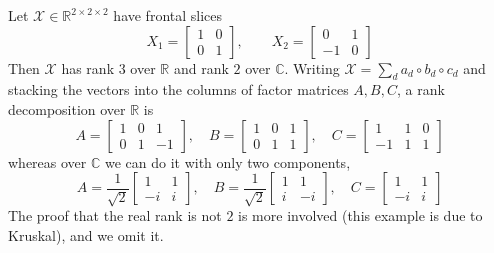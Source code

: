 \begin{enumerate}
    \begin{example}
      \label{ex:rank-over-r-vs-c}
      Let $\mathcal{X} \in \mathbb{R}^{2 \times 2 \times 2}$ have frontal slices
      \begin{equation}
        X_1 = \begin{bmatrix} 1 & 0 \\ 0 & 1 \end{bmatrix}, \qquad X_2 = \begin{bmatrix} 0 & 1 \\ -1 & 0 \end{bmatrix}
      \end{equation}
      Then $\mathcal{X}$ has rank $3$ over $\mathbb{R}$ and rank $2$ over $\mathbb{C}$. Writing $\mathcal{X} = \sum_{d} a_d \circ b_d \circ c_d$ and stacking the vectors into the columns of factor matrices $A, B, C$, a rank decomposition over $\mathbb{R}$ is
      \begin{equation}
        A = \begin{bmatrix} 1 & 0 & 1 \\ 0 & 1 & -1 \end{bmatrix}, \quad
        B = \begin{bmatrix} 1 & 0 & 1 \\ 0 & 1 & 1 \end{bmatrix}, \quad
        C = \begin{bmatrix} 1 & 1 & 0 \\ -1 & 1 & 1 \end{bmatrix}
      \end{equation}
      whereas over $\mathbb{C}$ we can do it with only two components,
      \begin{equation}
        A = \frac{1}{\sqrt{2}} \begin{bmatrix} 1 & 1 \\ -i & i \end{bmatrix}, \quad
        B = \frac{1}{\sqrt{2}} \begin{bmatrix} 1 & 1 \\ i & -i \end{bmatrix}, \quad
        C = \begin{bmatrix} 1 & 1 \\ -i & i \end{bmatrix}
      \end{equation}
      The proof that the real rank is not $2$ is more involved (this example is due to Kruskal), and we omit it.
    \end{example}


\end{enumerate}
